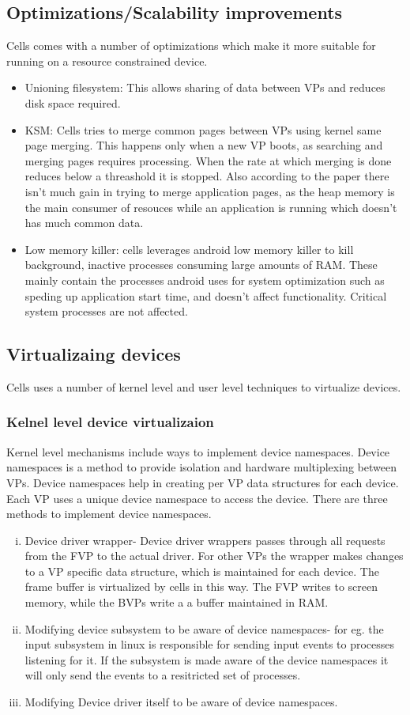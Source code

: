 \documentclass[a4paper,10pt]{article}
\begin{document}
\subsection*{Optimizations/Scalability improvements}
Cells comes with a number of optimizations which make it more suitable for running on a resource constrained device.
\begin{itemize}
 \item Unioning filesystem: This allows sharing of data between VPs and reduces disk space required.
 \item KSM: Cells tries to merge common pages between VPs using kernel same page merging. This happens only when a new VP boots, as searching and merging pages requires processing. When the rate at which merging is done reduces below a threashold it is stopped. Also according to the paper there isn't much gain in trying to merge application pages, as the heap memory is the main consumer of resouces while an application is running which doesn't has much common data.
\item Low memory killer: cells leverages android low memory killer to kill background, inactive processes consuming large amounts of RAM. These mainly contain the processes android uses for system optimization such as speding up application start time, and doesn't affect functionality. Critical system processes are not affected.
\end{itemize}
\subsection*{Virtualizaing devices}
Cells uses a number of kernel level and user level techniques to virtualize devices.  
\subsubsection*{Kelnel level device virtualizaion}
Kernel level mechanisms include ways to implement device namespaces. Device namespaces is a method to provide isolation and hardware multiplexing between VPs.
Device namespaces help in creating per VP data structures for each device. Each VP uses a unique device namespace to access the device.
There are three methods to implement device namespaces.
\begin{enumerate}[(i)]
 \item Device driver wrapper- Device driver wrappers passes through all requests from the FVP to the actual driver. For other VPs the wrapper makes changes to a VP specific data structure, which is maintained for each device. The frame buffer is virtualized by cells in this way. The FVP writes to screen memory, while the BVPs write a a buffer maintained in RAM.
 \item Modifying device subsystem to be aware of device namespaces- for eg. the input subsystem in linux is responsible for sending input events to processes listening for it. If the subsystem is made aware of the device namespaces it will only send the events to a resitricted set of processes.
 \item Modifying Device driver itself to be aware of device namespaces.
\end{enumerate}
\end{document}
